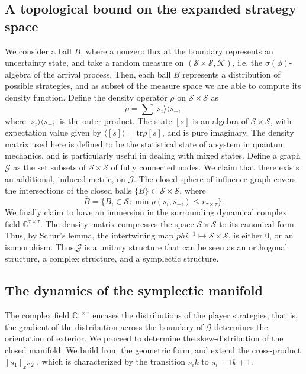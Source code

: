 \documentclass[11pt]{article}
\theoremstyle{definition}
\newcommand{\mcK}{\mathcal{K}}
\newcommand{\mcG}{\mathcal{G}}
\newcommand{\mcS}{\mathcal{S}}
\begin{document}
\subsection{A topological bound on the expanded strategy space}

We consider a ball $B$, where a nonzero flux at the boundary represents an
uncertainty state, and take a random measure on $(\mcS \times \mcS, \mcK)$, i.e.
the $\sigma(\phi)$-algebra of the arrival process.
Then, each ball $B$ represents a distribution of possible strategies, and as subset of the
measure space we are able to compute its density function. 
Define the density operator $\rho$ on $\mcS\times \mcS$ as
$$
    \rho = \displaystyle\sum \vert s_i\rangle\langle s_{-i}\vert
$$
where $\vert s_i\rangle\langle s_{-i}\vert$ is the outer product. The state
$[s]$ is an algebra of $\mcS\times\mcS$, with expectation
value given by $\langle [s] \rangle = \text{tr}{\rho [s]}$, and is pure imaginary.
The density matrix used here is defined to be the statistical state of a system in
quantum mechanics, and is particularly useful in dealing with mixed states.
Define a graph $\mcG$ as the set subsets of $\mcS\times\mcS$ of fully connected nodes.
We claim that there exists an additional, induced metric, on $\mcG$.
The closed sphere of influence graph covers the intersections
of the closed balls $\lbrace\overline{B}\rbrace \subset \mcS\times \mcS$, where
$$
    \overline{B}= \lbrace B_i \in \mcS : \min\rho(s_i, s_{-i}) \le
    r_{\tau\times\tau} \rbrace.
$$
We finally claim to have an immersion in the surrounding
dynamical complex field $\mathbb{C}^{\tau\times\tau}$. The density matrix compresses
the space $\mcS \times \mcS$ to its canonical form. Thus, by Schur's lemma, the intertwining map
$phi^{-1} \mapsto \mcS \times \mcS$, is either $0$, or an isomorphism.
Thus,$\mcG$ is a unitary structure that can be seen as an orthogonal structure, a complex
structure, and a symplectic structure.

\subsection{The dynamics of the symplectic manifold}

The complex field $\mathbb{C}^{\tau\times\tau}$ encases the distributions of the
player strategies; that is, the gradient of the distribution across the boundary
of $\mcG$ determines the orientation of exterior. 
We proceed to determine the skew-distribution of the closed manifold. We build from the geometric form, and
extend the cross-product $[s_1 ]_x s_2$ , which is characterized by the
transition $s_i \tilde k$ to $s_i+1 \tilde k + 1$.
\end{document}

